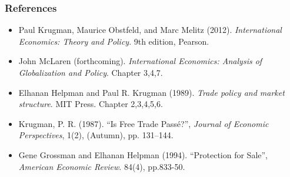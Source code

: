 \documentclass[12pt,onesided]{article}
\begin{document}
\subsubsection*{References} \small{ 
\begin{itemize}
	
	\item [] Paul Krugman, Maurice Obstfeld, and Marc Melitz  (2012). \emph{International Economics: Theory and Policy}. 9th edition, Pearson. 
	\item [] John McLaren (forthcoming). \emph{International Economics: Analysis of Globalization and Policy}. Chapter 3,4,7. 
		\item [] Elhanan Helpman and Paul R. Krugman (1989). \emph{Trade policy and market structure}. MIT Press. Chapter 2,3,4,5,6.
	\item [] Krugman, P. R. (1987). ``Is Free Trade Pass\'{e}?'', \emph{Journal of Economic Perspectives}, 1(2), (Autumn), pp. 131–144.
	\item  [] Gene Grossman and Elhanan Helpman (1994). ``Protection for Sale'', \emph{American Economic Review}. 84(4), pp.833-50.
	
	
	
	
	
	
\end{itemize}
}

%
\end{document}
